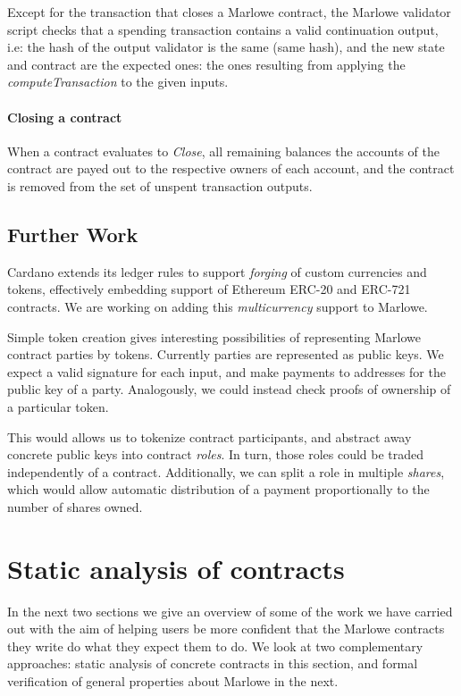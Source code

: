 \documentclass[runningheads]{llncs}
\begin{document}
Except for the transaction that closes a Marlowe contract, the Marlowe validator script checks that a spending transaction contains a valid continuation
output, i.e: the hash of the output validator is the same (same hash), and the new state and contract are the expected ones: the ones resulting from applying the \emph{computeTransaction} to the given inputs.

\paragraph{Closing a contract}

When a contract evaluates to \emph{Close}, all remaining balances the accounts of the contract are payed out
to the respective owners of each account, and the contract is removed from the set of unspent transaction outputs.

\subsection{Further Work}

Cardano extends its ledger rules to support \emph{forging} of custom currencies and tokens,
effectively embedding support of Ethereum ERC-20 and ERC-721 contracts.
We are working on adding this \emph{multicurrency} support to Marlowe.

Simple token creation gives interesting possibilities of representing Marlowe contract parties by tokens.
Currently parties are represented as public keys. We expect a valid signature for each input,
and make payments to addresses for the public key of a party.
Analogously, we could instead check proofs of ownership of a particular token.

This would allows us to tokenize contract participants, and abstract away concrete public keys into contract \emph{roles}.
In turn, those roles could be traded independently of a contract.
Additionally, we can split a role in multiple \emph{shares}, which would allow automatic distribution of a payment
proportionally to the number of shares owned.

\section{Static analysis of contracts\label{sec:static}}

In the next two sections we give an overview of some of the work we have carried out with the aim of helping users be more confident that the Marlowe contracts they write do what they expect them to do.
We look at two complementary approaches: static analysis of concrete contracts in this section,  and formal verification of general properties about Marlowe in the next.
\end{document}
